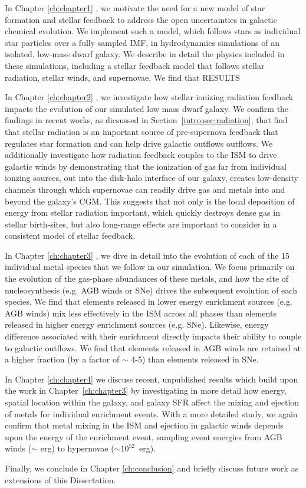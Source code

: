 In Chapter \ref{ch:chapter1} \citep[published as ][]{Emerick2019}, we motivate the need for a new model of star formation and stellar feedback to address the open uncertainties in galactic chemical evolution. We implement such a model, which follows stars as individual star particles over a fully sampled IMF, in hydrodynamics simulations of an isolated, low-mass dwarf galaxy. We describe in detail the physics included in these simulations, including a stellar feedback model that follows stellar radiation, stellar winds, and supernovae. We find that RESULTS

In Chapter \ref{ch:chapter2} \citep[published as ][]{Emerick2018a}, we investigate how stellar ionizing radiation feedback impacts the evolution of our simulated low mass dwarf galaxy. We confirm the findings in recent works, as dicsussed in Section~\ref{intro:sec:radiation}, that find that stellar radiation is an important source of pre-supernova feedback that regulates star formation and can help drive galactic outflows outflows. We additionally investigate how radiation feedback couples to the ISM to drive galactic winds by demonstrating that the ionization of gas far from individual ionzing sources, out into the disk-halo interface of our galaxy, creates low-density channels through which supernovae can readily drive gas and metals into and beyond the galaxy's CGM. This suggests that not only is the local deposition of energy from stellar radiation important, which quickly destroys dense gas in stellar birth-sites, but also long-range effects are important to consider in a consistent model of stellar feedback.

In Chapter \ref{ch:chapter3} \citep[published as ][]{Emerick2018b}, we dive in detail into the evolution of each of the 15 individual metal species that we follow in our simulation. We focus primarily on the evolution of the gas-phase abundances of these metals, and how the site of nucleosynthesis (e.g. AGB winds or SNe) drives the subsequent evolution of each species. We find that elements released in lower energy enrichment sources (e.g. AGB winds) mix less effectively in the ISM across all phases than elements released in higher energy enrichment sources (e.g. SNe). Likewise, energy difference associated with their enrichment directly impacts their ability to couple to galactic outflows. We find that elements released in AGB winds are retained at a higher fraction (by a factor of $\sim$ 4-5) than elements released in SNe. 

In Chapter \ref{ch:chapter4} we discuss recent, unpublished results which build upon the work in Chapter~\ref{ch:chapter3} by investigating in more detail how energy, spatial location within the galaxy, and galaxy SFR affect the mixing and ejection of metals for individual enrichment events. With a more detailed study, we again confirm that metal mixing in the ISM and ejection in galactic winds depends upon the energy of the enrichment event, sampling event energies from AGB winds ($\sim$ erg) to hypernovae ($\sim 10^{52}$~erg).

Finally, we conclude in Chapter \ref{ch:conclusion} and briefly discuss future work as extensions of this Dissertation.
